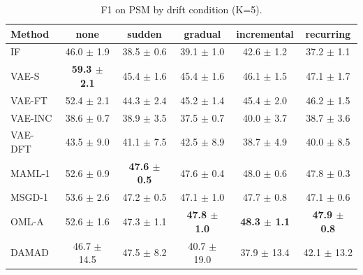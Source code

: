 \begin{table}[t]
\centering
\small
\caption{F1 on PSM by drift condition (K=5).}
\label{tab:drift_f1_psm}
\begin{tabular}{lccccc}
\toprule
Method & none & sudden & gradual & incremental & recurring \\
\midrule
IF & 46.0 $\pm$ 1.9 & 38.5 $\pm$ 0.6 & 39.1 $\pm$ 1.0 & 42.6 $\pm$ 1.2 & 37.2 $\pm$ 1.1 \\
VAE-S & \textbf{59.3 $\pm$ 2.1} & 45.4 $\pm$ 1.6 & 45.4 $\pm$ 1.6 & 46.1 $\pm$ 1.5 & 47.1 $\pm$ 1.7 \\
VAE-FT & 52.4 $\pm$ 2.1 & 44.3 $\pm$ 2.4 & 45.2 $\pm$ 1.4 & 45.4 $\pm$ 2.0 & 46.2 $\pm$ 1.5 \\
VAE-INC & 38.6 $\pm$ 0.7 & 38.9 $\pm$ 3.5 & 37.5 $\pm$ 0.7 & 40.0 $\pm$ 3.7 & 38.7 $\pm$ 3.6 \\
VAE-DFT & 43.5 $\pm$ 9.0 & 41.1 $\pm$ 7.5 & 42.5 $\pm$ 8.9 & 38.7 $\pm$ 4.9 & 40.0 $\pm$ 8.5 \\
MAML-1 & 52.6 $\pm$ 0.9 & \textbf{47.6 $\pm$ 0.5} & 47.6 $\pm$ 0.4 & 48.0 $\pm$ 0.6 & 47.8 $\pm$ 0.3 \\
MSGD-1 & 53.6 $\pm$ 2.6 & 47.2 $\pm$ 0.5 & 47.1 $\pm$ 1.0 & 47.7 $\pm$ 0.8 & 47.1 $\pm$ 0.6 \\
OML-A & 52.6 $\pm$ 1.6 & 47.3 $\pm$ 1.1 & \textbf{47.8 $\pm$ 1.0} & \textbf{48.3 $\pm$ 1.1} & \textbf{47.9 $\pm$ 0.8} \\
DAMAD & 46.7 $\pm$ 14.5 & 47.5 $\pm$ 8.2 & 40.7 $\pm$ 19.0 & 37.9 $\pm$ 13.4 & 42.1 $\pm$ 13.2 \\
\bottomrule
\end{tabular}
\end{table}


